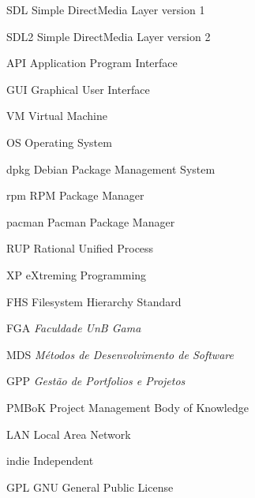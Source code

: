 \begin{siglas}
  \item[SDL] Simple DirectMedia Layer version 1
  \item[SDL2] Simple DirectMedia Layer version 2
  \item[API] Application Program Interface
  \item[GUI] Graphical User Interface
  \item[VM] Virtual Machine
  \item[OS] Operating System
  \item[dpkg] Debian Package Management System
  \item[rpm] RPM Package Manager
  \item[pacman] Pacman Package Manager
  \item[RUP] Rational Unified Process
  \item[XP] eXtreming Programming
  \item[FHS] Filesystem Hierarchy Standard
  \item[FGA] \textit{Faculdade UnB Gama}
  \item[MDS] \textit{M\'etodos de Desenvolvimento de Software}
  \item[GPP] \textit{Gest\~ao de Portfolios e Projetos}
  \item[PMBoK] Project Management Body of Knowledge
  \item[LAN] Local Area Network
  \item[indie] Independent
  \item[GPL] GNU General Public License
\end{siglas}
